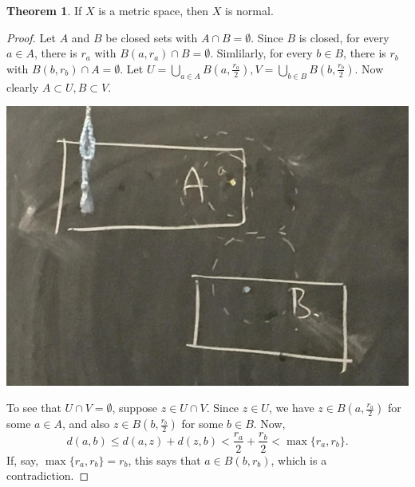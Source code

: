 \documentclass[a5paper]{article}
\theoremstyle{definition}%
\newtheorem{theorem}{Theorem}
\numberwithin{exercise}{section}
\theoremstyle{remark}%
\begin{document}
\begin{highlight}
\begin{theorem}
If $X$ is a metric space, then $X$ is normal. 
\end{theorem}
\end{highlight}
\begin{proof}
Let $A$ and $B$ be closed sets with $A\cap B =\emptyset$. Since $B$ is closed, for every $a\in A$, there is $r_a$ with $B(a,r_a)\cap B = \emptyset$. Simlilarly, for every $b\in B$, there is $r_b$ with $B(b,r_b)\cap A = \emptyset$. Let $U=\bigcup_{a\in A}B(a,\frac{r_a}{2}), V=\bigcup_{b\in B}B(b,\frac{r_b}{2})$. Now clearly $A\subset U, B\subset V$. 

\begin{center}
\includegraphics[scale=.12]{images/separation_1}
\end{center}

To see that $U\cap V=\emptyset$, suppose $z\in U\cap V$. Since $z\in U$, we have $z\in B(a,\frac{r_a}{2})$ for some $a\in A$, and also $z\in B(b,\frac{r_b}{2})$ for some $b\in B$. Now, 
$$d(a,b)\leq d(a,z)+d(z,b)< \frac{r_a}{2}+\frac{r_b}{2} <\max\{r_a,r_b\}.$$
If, say, $\max\{r_a,r_b\}=r_b$, this says that $a\in B(b,r_b)$, which is a contradiction. 
\end{proof}
\end{document}
